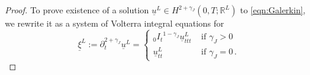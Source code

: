 \begin{proof}
\begin{comment}
(\mbox{if }\gamma_J>0:\ \underline{u}_{tt}^L(0)=\underline{u}_2^L)\,.
\end{equation}
Here the matrices and vectors are defined by 
\begin{equation*}
\begin{aligned}
&\underline{u}^L (t)= (u^L_i(t))_{i=1,\ldots L}\,, \quad 
\underline{u}^L_k  = (\langle u_k,\varphi_i\rangle)_{i=1,\ldots L}\,, \ k\in\{0,1,2\}\,,\\
&\underline{r}^L (t) = (\langle r(t),\varphi_i\rangle)_{i=1,\ldots L}\,, \quad
\Lambda^L = \mbox{diag}(\lambda_1,\ldots,\lambda_L)\,,\\
&M_{d,j}^L=(\langle d_j\varphi_i,\varphi_j\rangle)_{i,j=1,\ldots L}\,, \quad 
M_{b,k}^L=(\langle b_k\varphi_i,\varphi_j\rangle)_{i,j=1,\ldots L}\,, \\ 
&K_{b,k}^L%
=(\lambda_i\langle b_k \varphi_i,\varphi_j\rangle)_{i,j=1,\ldots L}
=\Lambda^L M_{b,k}^L(t)\,.
\end{aligned}
\end{equation*}
Note that due to \eqref{eqn:dJbK} and since we assume the eigenfunctions to be normalised in $L^2_w(\Omega)$, the matrix $M_{d,J}^L$ is positive definite with eigenvalues bounded away from zero by $d_J$.
\end{comment}
To prove existence of a solution $\underline{u}^L\in H^{2+\gamma_J}(0,T;\mathbb{R}^L)$
to \eqref{eqn:Galerkin}, 
we rewrite it as a system of Volterra integral equations for 
\[
\underline{\xi}^L:= \partial_t^{2+\gamma_J}\underline{u}^L = 
\begin{cases}
{_0I_t}^{1-\gamma_J}\underline{u}_{ttt}^L &\mbox{ if }\gamma_J>0\\
\underline{u}_{tt}^L &\mbox{ if }\gamma_J=0\,.
\end{cases}
\]
\begin{comment}
For this purpose we use the identities %
\[
\begin{aligned}
\partial_t^{2+\gamma_j}\underline{u}^L
&={_0I_t}^{\gamma_J-\gamma_j}\underline{\xi}^L \mbox{ for } \gamma_j>0\,, \quad
\partial_t^{2+\gamma_0}\underline{u}^L={_0I_t}^{\gamma_J}\underline{\xi}^L+\underline{u}_2^L \mbox{ if } \gamma_0=0\,, \\
\underline{u}_t^L(t) 
&= \begin{cases}
{_0I_t}^2 \underline{u}_{ttt}^L(t) + t \underline{u}_2^L + \underline{u}_1^L &\mbox{ if }\gamma_J>0\\

\end{comment}
\end{proof}
